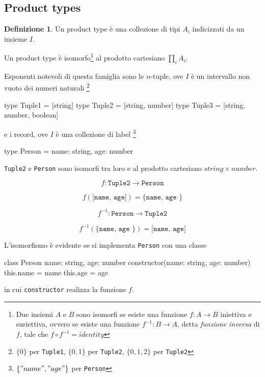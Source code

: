\documentclass[12pt]{article}
\theoremstyle{definition}
\newtheorem{definition}{Definizione}[section]
\newenvironment{code}
  {\vspace{0.5cm} \VerbatimEnvironment\begin{typescriptcode}}
  {\end{typescriptcode} \vspace{0.2cm}}
\begin{document}
\subsection{Product types}

\begin{definition}
Un product type è una collezione di tipi $A_i$ indicizzati da un insieme $I$.
\end{definition}

Un product type è isomorfo\footnote{Due insiemi $A$ e $B$ sono isomorfi se esiste una funzione $f: A \rightarrow B$ iniettiva e suriettiva,
ovvero se esiste una funzione $f^{-1}: B \rightarrow A$, detta \emph{funzione inversa} di $f$, tale che $f \circ f^{-1} = identity$}
al prodotto cartesiano $\prod_i A_i$.

Esponenti notevoli di questa famiglia sono le $n$-tuple, ove $I$ è un intervallo non vuoto dei numeri naturali
\footnote{$\{0\}$ per \texttt{Tuple1}, $\{0, 1\}$ per \texttt{Tuple2}, $\{0, 1, 2\}$ per \texttt{Tuple2}}

\begin{code}
type Tuple1 = [string]
type Tuple2 = [string, number]
type Tuple3 = [string, number, boolean]
\end{code}

e i record, ove $I$ è una collezione di label
\footnote{$\{ "name", "age" \}$ per \texttt{Person}}

\begin{code}
type Person = {
  name: string,
  age: number
}
\end{code}

\texttt{Tuple2} e \texttt{Person} sono isomorfi tra loro e al prodotto cartesiano $string \times number$.

$$
f: \texttt{Tuple2} \rightarrow \texttt{Person}
$$

$$
f(\texttt{[name, age]}) = \texttt{\{ name, age  \}}
$$

$$
f^{-1}: \texttt{Person} \rightarrow \texttt{Tuple2}
$$

$$
f^{-1}(\texttt{\{ name, age  \}}) = \texttt{[name, age]}
$$

L'isomorfismo è evidente se si implementa \texttt{Person} con una classe

\begin{code}
class Person {
  name: string,
  age: number
  constructor(name: string, age: number) {
    this.name = name
    this.age = age
  }
}
\end{code}

in cui \texttt{constructor} realizza la funzione $f$.
\end{document}
